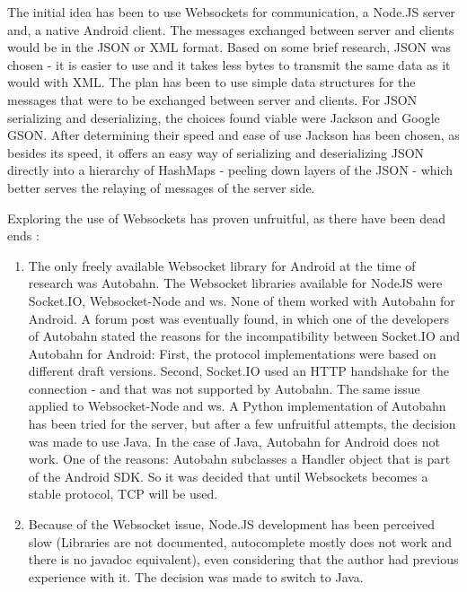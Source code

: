 The initial idea has been to use Websockets for communication, a Node.JS server
and, a native Android client. The messages exchanged between server and clients
would be in the JSON or XML format. Based on some brief research, JSON was
chosen - it is easier to use and it takes less bytes to transmit the same data
as it would with XML. The plan has been to use simple data structures for the
messages that were to be exchanged between server and clients. For JSON
serializing and deserializing, the choices found viable were Jackson and
Google GSON. After determining their speed and ease of use Jackson has been
chosen, as besides its speed, it offers an easy way of serializing and
deserializing JSON directly into a hierarchy of HashMaps - peeling down layers
of the JSON - which better serves the relaying of messages of the server side.
\newline

Exploring the use of Websockets has proven unfruitful, as there have been dead
ends :

\begin{enumerate}
  \item The only freely available Websocket library for Android at the time of
  research was Autobahn. The Websocket libraries available for NodeJS were
  Socket.IO, Websocket-Node and ws. None of them worked with Autobahn for
  Android. A forum post was eventually found, in which one of the developers of
  Autobahn stated the reasons for the incompatibility between Socket.IO and
  Autobahn for Android: First, the protocol implementations were based on
  different draft versions. Second, Socket.IO used an HTTP handshake for the
  connection - and that was not supported by Autobahn. The same issue applied to
  Websocket-Node and ws. A Python implementation of Autobahn has been tried for
  the server, but after a few unfruitful attempts, the decision was made to
  use Java. In the case of Java, Autobahn for Android does not work. One of the
  reasons: Autobahn subclasses a Handler object that is part of the Android
  SDK. So it was decided that until Websockets becomes a stable protocol, TCP
  will be used.
  
  \item Because of the Websocket issue, Node.JS development has been perceived
  slow (Libraries are not documented, autocomplete mostly does not work and
  there is no javadoc equivalent), even considering that the author had
  previous experience with it. The decision was made to switch to Java.  
\end{enumerate}

